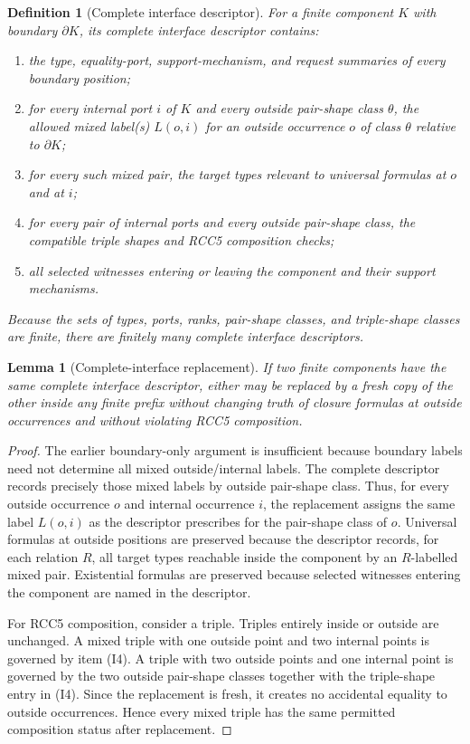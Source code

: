 \documentclass[11pt]{article}
\newtheorem{lemma}[theorem]{Lemma}
\newtheorem{definition}[theorem]{Definition}
\begin{document}
\begin{definition}[Complete interface descriptor]
\label{def:complete-interface}
For a finite component $K$ with boundary $\partial K$, its complete interface descriptor contains:
\begin{enumerate}[label=(I\arabic*)]
\item the type, equality-port, support-mechanism, and request summaries of every boundary position;
\item for every internal port $i$ of $K$ and every outside pair-shape class $\theta$, the allowed mixed label(s) $L(o,i)$ for an outside occurrence $o$ of class $\theta$ relative to $\partial K$;
\item for every such mixed pair, the target types relevant to universal formulas at $o$ and at $i$;
\item for every pair of internal ports and every outside pair-shape class, the compatible triple shapes and RCC5 composition checks;
\item all selected witnesses entering or leaving the component and their support mechanisms.
\end{enumerate}
Because the sets of types, ports, ranks, pair-shape classes, and triple-shape classes are finite, there are finitely many complete interface descriptors.
\end{definition}

\begin{lemma}[Complete-interface replacement]
\label{lem:replacement}
If two finite components have the same complete interface descriptor, either may be replaced by a fresh copy of the other inside any finite prefix without changing truth of closure formulas at outside occurrences and without violating RCC5 composition.
\end{lemma}

\begin{proof}
The earlier boundary-only argument is insufficient because boundary labels need not determine all mixed outside/internal labels.  The complete descriptor records precisely those mixed labels by outside pair-shape class.  Thus, for every outside occurrence $o$ and internal occurrence $i$, the replacement assigns the same label $L(o,i)$ as the descriptor prescribes for the pair-shape class of $o$.  Universal formulas at outside positions are preserved because the descriptor records, for each relation $R$, all target types reachable inside the component by an $R$-labelled mixed pair.  Existential formulas are preserved because selected witnesses entering the component are named in the descriptor.

For RCC5 composition, consider a triple.  Triples entirely inside or outside are unchanged.  A mixed triple with one outside point and two internal points is governed by item (I4).  A triple with two outside points and one internal point is governed by the two outside pair-shape classes together with the triple-shape entry in (I4).  Since the replacement is fresh, it creates no accidental equality to outside occurrences.  Hence every mixed triple has the same permitted composition status after replacement.
\end{proof}
\end{document}

